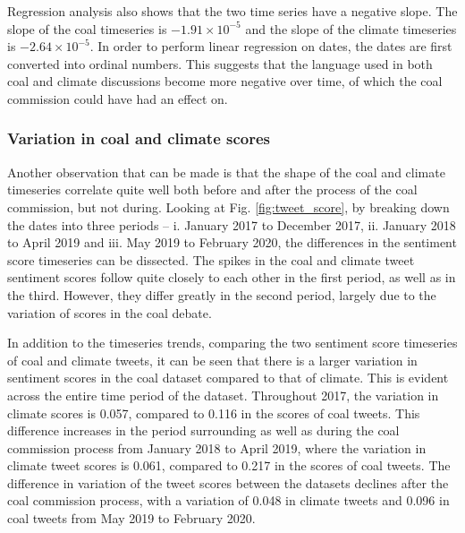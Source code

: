 \documentclass[12pt,onecolumn,twoside]{layout}
\begin{document}
Regression analysis also shows that the two time series have a negative slope. The slope of the coal timeseries is $-1.91 \times 10^{-5}$ and the slope of the climate timeseries is $-2.64 \times 10^{-5}$. In order to perform linear regression on dates, the dates are first converted into ordinal numbers. This suggests that the language used in both coal and climate discussions become more negative over time, of which the coal commission could have had an effect on. 


\subsubsection*{Variation in coal and climate scores} %
Another observation that can be made is that the shape of the coal and climate timeseries correlate quite well both before and after the process of the coal commission, but not during. Looking at Fig. \ref{fig:tweet_score}, by breaking down the dates into three periods -- i. January 2017 to December 2017, ii. January 2018 to April 2019 and iii. May 2019 to February 2020, the differences in the sentiment score timeseries can be dissected. The spikes in the coal and climate tweet sentiment scores follow quite closely to each other in the first period, as well as in the third. However, they differ greatly in the second period, largely due to the variation of scores in the coal debate. 

In addition to the timeseries trends, comparing the two sentiment score timeseries of coal and climate tweets, it can be seen that there is a larger variation in sentiment scores in the coal dataset compared to that of climate. This is evident across the entire time period of the dataset. Throughout 2017, the variation in climate scores is 0.057, compared to 0.116 in the scores of coal tweets. This difference increases in the period surrounding as well as during the coal commission process from January 2018 to April 2019, where the variation in climate tweet scores is 0.061, compared to 0.217 in the scores of coal tweets. The difference in variation of the tweet scores between the datasets declines after the coal commission process, with a variation of 0.048 in climate tweets and 0.096 in coal tweets from May 2019 to February 2020. 
\end{document}
